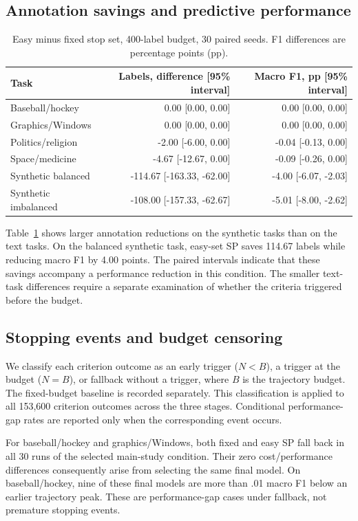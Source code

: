 \documentclass[10pt,twocolumn]{article}
\begin{document}
\subsection{Annotation savings and predictive performance}
\begin{table}[t]
\centering\small
\begin{tabular}{lrr}
\toprule
Task & Labels, difference [95\% interval] & Macro F1, pp [95\% interval]\\
\midrule
Baseball/hockey & 0.00 [0.00, 0.00] & 0.00 [0.00, 0.00]\\
Graphics/Windows & 0.00 [0.00, 0.00] & 0.00 [0.00, 0.00]\\
Politics/religion & -2.00 [-6.00, 0.00] & -0.04 [-0.13, 0.00]\\
Space/medicine & -4.67 [-12.67, 0.00] & -0.09 [-0.26, 0.00]\\
Synthetic balanced & -114.67 [-163.33, -62.00] & -4.00 [-6.07, -2.03]\\
Synthetic imbalanced & -108.00 [-157.33, -62.67] & -5.01 [-8.00, -2.62]\\
\bottomrule
\end{tabular}
\caption{Easy minus fixed stop set, 400-label budget, 30 paired seeds. F1 differences are percentage points (pp).}\label{tab:stopsets}
\end{table}
Table~\ref{tab:stopsets} shows larger annotation reductions on the synthetic tasks than on the text tasks. On the balanced synthetic task, easy-set SP saves 114.67 labels while reducing macro F1 by 4.00 points. The paired intervals indicate that these savings accompany a performance reduction in this condition. The smaller text-task differences require a separate examination of whether the criteria triggered before the budget.

\subsection{Stopping events and budget censoring}
We classify each criterion outcome as an early trigger ($N<B$), a trigger at the budget ($N=B$), or fallback without a trigger, where $B$ is the trajectory budget. The fixed-budget baseline is recorded separately. This classification is applied to all 153,600 criterion outcomes across the three stages. Conditional performance-gap rates are reported only when the corresponding event occurs.

For baseball/hockey and graphics/Windows, both fixed and easy SP fall back in all 30 runs of the selected main-study condition. Their zero cost/performance differences consequently arise from selecting the same final model. On baseball/hockey, nine of these final models are more than .01 macro F1 below an earlier trajectory peak. These are performance-gap cases under fallback, not premature stopping events.
\end{document}
